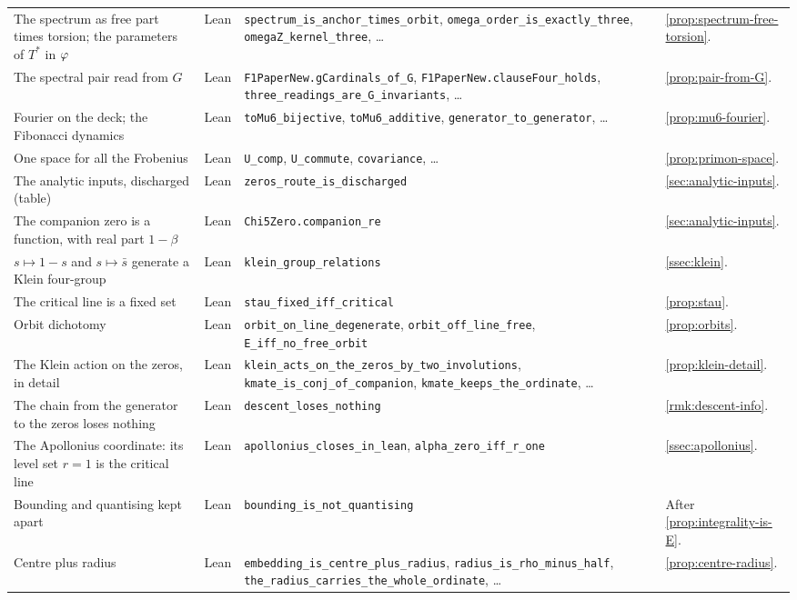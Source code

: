{\begin{longtable}{>{\raggedright\arraybackslash}p{}>{\raggedright\arraybackslash}p{}>{\raggedright\arraybackslash}p{}>{\raggedright\arraybackslash}p{}}
The spectrum as free part times torsion; the parameters of $T^*$ in $\varphi$ & Lean & \texttt{spectrum\_is\_anchor\_times\_orbit}, \texttt{omega\_order\_is\_exactly\_three}, \texttt{omegaZ\_kernel\_three}, \dots & \cref{prop:spectrum-free-torsion}.\\
The spectral pair read from $G$ & Lean & \texttt{F1PaperNew.gCardinals\_of\_G}, \texttt{F1PaperNew.clauseFour\_holds}, \texttt{three\_readings\_are\_G\_invariants}, \dots & \cref{prop:pair-from-G}.\\
Fourier on the deck; the Fibonacci dynamics & Lean & \texttt{toMu6\_bijective}, \texttt{toMu6\_additive}, \texttt{generator\_to\_generator}, \dots & \cref{prop:mu6-fourier}.\\
One space for all the Frobenius & Lean & \texttt{U\_comp}, \texttt{U\_commute}, \texttt{covariance}, \dots & \cref{prop:primon-space}.\\
The analytic inputs, discharged (table) & Lean & \texttt{zeros\_route\_is\_discharged} & \cref{sec:analytic-inputs}.\\
The companion zero is a function, with real part $1-\beta$ & Lean & \texttt{Chi5Zero.companion\_re} & \cref{sec:analytic-inputs}.\\
$s\mapsto1-s$ and $s\mapsto\bar s$ generate a Klein four-group & Lean & \texttt{klein\_group\_relations} & \cref{ssec:klein}.\\
The critical line is a fixed set & Lean & \texttt{stau\_fixed\_iff\_critical} & \cref{prop:stau}.\\
Orbit dichotomy & Lean & \texttt{orbit\_on\_line\_degenerate}, \texttt{orbit\_off\_line\_free}, \texttt{E\_iff\_no\_free\_orbit} & \cref{prop:orbits}.\\
The Klein action on the zeros, in detail & Lean & \texttt{klein\_acts\_on\_the\_zeros\_by\_two\_involutions}, \texttt{kmate\_is\_conj\_of\_companion}, \texttt{kmate\_keeps\_the\_ordinate}, \dots & \cref{prop:klein-detail}.\\
The chain from the generator to the zeros loses nothing & Lean & \texttt{descent\_loses\_nothing} & \cref{rmk:descent-info}.\\
The Apollonius coordinate: its level set $r=1$ is the critical line & Lean & \texttt{apollonius\_closes\_in\_lean}, \texttt{alpha\_zero\_iff\_r\_one} & \cref{ssec:apollonius}.\\
Bounding and quantising kept apart & Lean & \texttt{bounding\_is\_not\_quantising} & After \cref{prop:integrality-is-E}.\\
Centre plus radius & Lean & \texttt{embedding\_is\_centre\_plus\_radius}, \texttt{radius\_is\_rho\_minus\_half}, \texttt{the\_radius\_carries\_the\_whole\_ordinate}, \dots & \cref{prop:centre-radius}.\\

\end{longtable}}

